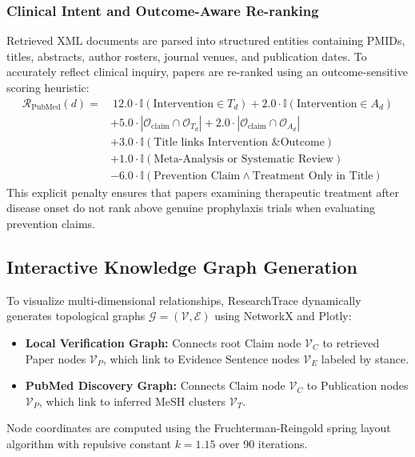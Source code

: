 \documentclass[conference]{IEEEtran}
\begin{document}
\subsubsection{Clinical Intent and Outcome-Aware Re-ranking}
Retrieved XML documents are parsed into structured entities containing PMIDs, titles, abstracts, author rosters, journal venues, and publication dates. To accurately reflect clinical inquiry, papers are re-ranked using an outcome-sensitive scoring heuristic:
\begin{align}
\mathcal{R}_{\text{PubMed}}(d) = &\ 12.0 \cdot \mathbb{I}(\text{Intervention} \in T_d) + 2.0 \cdot \mathbb{I}(\text{Intervention} \in A_d) \nonumber \\
&+ 5.0 \cdot |\mathcal{O}_{\text{claim}} \cap \mathcal{O}_{T_d}| + 2.0 \cdot |\mathcal{O}_{\text{claim}} \cap \mathcal{O}_{A_d}| \nonumber \\
&+ 3.0 \cdot \mathbb{I}(\text{Title links Intervention \& Outcome}) \nonumber \\
&+ 1.0 \cdot \mathbb{I}(\text{Meta-Analysis or Systematic Review}) \nonumber \\
&- 6.0 \cdot \mathbb{I}(\text{Prevention Claim} \land \text{Treatment Only in Title})
\end{align}
This explicit penalty ensures that papers examining therapeutic treatment after disease onset do not rank above genuine prophylaxis trials when evaluating prevention claims.

\subsection{Interactive Knowledge Graph Generation}
To visualize multi-dimensional relationships, ResearchTrace dynamically generates topological graphs $\mathcal{G} = (\mathcal{V}, \mathcal{E})$ using NetworkX and Plotly:
\begin{itemize}
    \item \textbf{Local Verification Graph:} Connects root Claim node $\mathcal{V}_C$ to retrieved Paper nodes $\mathcal{V}_P$, which link to Evidence Sentence nodes $\mathcal{V}_E$ labeled by stance.
    \item \textbf{PubMed Discovery Graph:} Connects Claim node $\mathcal{V}_C$ to Publication nodes $\mathcal{V}_P$, which link to inferred MeSH clusters $\mathcal{V}_T$.
\end{itemize}
Node coordinates are computed using the Fruchter\-man-Rein\-gold spring layout algorithm with repulsive constant $k = 1.15$ over 90 iterations.
\end{document}
